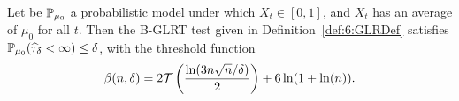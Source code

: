 \begin{lemma}\label{lem:6:FalseAlarm}
\begin{leftbar}[lemmabar]  %
    Let be $\mathbb{P}_{\mu_0}$ a probabilistic model under which $X_t \in [0,1]$, and $X_t$ has an average of $\mu_0$ for all $t$.
    Then the B-GLRT test given in Definition~\ref{def:6:GLRDef} satisfies
    $\mathbb{P}_{\mu_0}(\widehat{\tau}_\delta < \infty) \leq \delta$, with the threshold function
    \begin{equation}\label{def:6:beta}
        \beta(n,\delta) = 2\mathcal{T}\left(\frac{\ln(3n\sqrt{n}/\delta)}{2}\right) + 6\ln(1+\ln(n)).
    \end{equation}
\end{leftbar}  %
\end{lemma}

